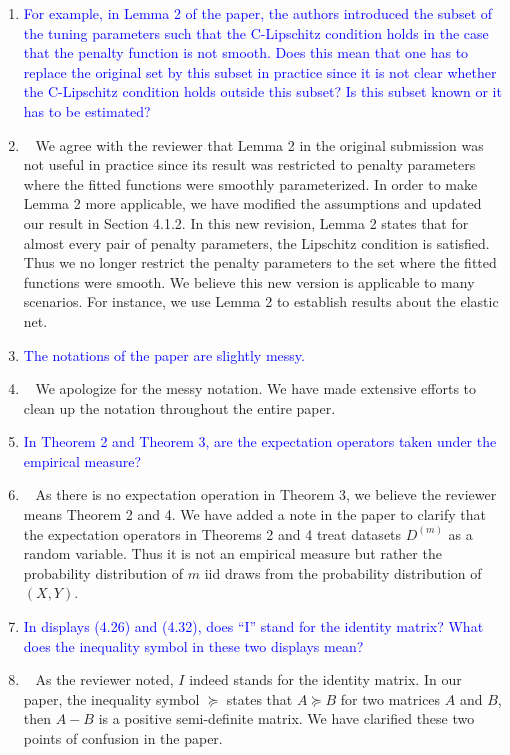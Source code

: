 \documentclass[]{article}
\newcommand{\point}[1]{\item \textcolor{blue}{#1}}
\newcommand{\reply}{\item[]\ }
\begin{document}
\begin{enumerate}
{		}
		
		\point{
			For example, in Lemma 2 of the paper, the authors introduced the subset of the tuning parameters such that the C-Lipschitz condition holds in the case that the penalty function is not smooth.
			Does this mean that one has to replace the original set by this subset in practice since it is not clear whether the C-Lipschitz condition holds outside this subset?
			Is this subset known or it has to be estimated?
		}
		\reply{
		We agree with the reviewer that Lemma 2 in the original submission was not useful in practice since its result was restricted to penalty parameters where the fitted functions were smoothly parameterized.
		In order to make Lemma 2 more applicable, we have modified the assumptions and updated our result in Section 4.1.2.
		In this new revision, Lemma 2 states that for almost every pair of penalty parameters, the Lipschitz condition is satisfied.
		Thus we no longer restrict the penalty parameters to the set where the fitted functions were smooth.
		We believe this new version is applicable to many scenarios.
		For instance, we use Lemma 2 to establish results about the elastic net.
		}
		
		\point{
		The notations of the paper are slightly messy.
		}
	
		\reply{
			We apologize for the messy notation. We have made extensive efforts to clean up the notation throughout the entire paper.
		}
	
		\point{
			In Theorem 2 and Theorem 3, are the expectation operators taken under the empirical measure?
		}
		\reply{
			As there is no expectation operation in Theorem 3, we believe the reviewer means Theorem 2 and 4.
			We have added a note in the paper to clarify that the expectation operators in Theorems 2 and 4 treat datasets $D^{(m)}$ as a random variable.
			Thus it is not an empirical measure but rather the probability distribution of $m$ iid draws from the probability distribution of $(X,Y)$.
		}
		\point{
			In displays (4.26) and (4.32), does “I” stand for the identity matrix? What does the inequality symbol in these two displays mean?
		}
	
		\reply{
			As the reviewer noted, $I$ indeed stands for the identity matrix.
			In our paper, the inequality symbol $\succeq$ states that $A \succeq B$ for two matrices $A$ and $B$, then $A - B$ is a positive semi-definite matrix.
			We have clarified these two points of confusion in the paper.
		}
	\end{enumerate} 
	
\end{document}
